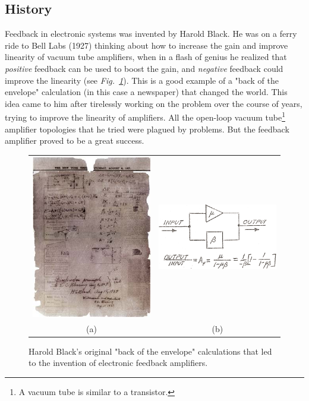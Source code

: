 \subsection{History}
Feedback in electronic systems was invented by Harold Black.  He was on a ferry ride to Bell Labs (1927) thinking about how to increase the gain and improve linearity of vacuum tube amplifiers, when in a flash of genius he realized that \textit{positive} feedback can be used to boost the gain, and \textit{negative} feedback could improve the linearity (see \emph{Fig.~\ref{fig:image_1.jpg}}).
This is a good example of a "back of the envelope" calculation (in this case a newspaper) that changed the world.  This idea came to him after tirelessly working on the problem over the course of years, trying to improve the linearity of amplifiers.  All the open-loop vacuum tube\footnote{A vacuum tube is similar to a transistor.} amplifier topologies that he tried were plagued by problems.  But the feedback amplifier proved to be a great success.
\newpage
\begin{figure}[t]
\centering
\begin{tabular}{cc}
\includegraphics[width=.5\columnwidth]{image_1.jpg} &
\includegraphics[width=.4\columnwidth]{image_2.png}\\
(a) & (b)\\
\end{tabular}
\caption{Harold Black's original "back of the envelope" calculations that led to the invention of electronic feedback amplifiers.}
\label{fig:image_1.jpg}
\end{figure}
